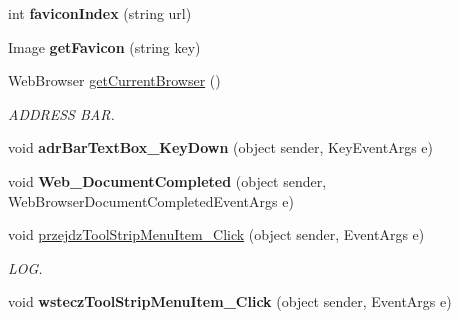 \begin{DoxyCompactItemize}
int {\bfseries favicon\+Index} (string url)
\item 
\mbox{\label{class_windows_forms_app2_1_1_przegladarka_a6d41c318a647f8a1054fdbe57c3c132a}} 
Image {\bfseries get\+Favicon} (string key)
\item 
\mbox{\label{class_windows_forms_app2_1_1_przegladarka_a4d940c14c495053bb984ff254991afbc}} 
Web\+Browser \hyperlink{class_windows_forms_app2_1_1_przegladarka_a4d940c14c495053bb984ff254991afbc}{get\+Current\+Browser} ()
\begin{DoxyCompactList}\small\item\em A\+D\+D\+R\+E\+SS B\+AR. \end{DoxyCompactList}\item 
\mbox{\label{class_windows_forms_app2_1_1_przegladarka_a2c16d9618e633748a8a7eb8c3daa6dc7}} 
void {\bfseries adr\+Bar\+Text\+Box\+\_\+\+Key\+Down} (object sender, Key\+Event\+Args e)
\item 
\mbox{\label{class_windows_forms_app2_1_1_przegladarka_ab0b9d9fb2c8ac43d3db70ed17e913813}} 
void {\bfseries Web\+\_\+\+Document\+Completed} (object sender, Web\+Browser\+Document\+Completed\+Event\+Args e)
\item 
\mbox{\label{class_windows_forms_app2_1_1_przegladarka_a0426aa03eb6aa34e371a649c317a6995}} 
void \hyperlink{class_windows_forms_app2_1_1_przegladarka_a0426aa03eb6aa34e371a649c317a6995}{przejdz\+Tool\+Strip\+Menu\+Item\+\_\+\+Click} (object sender, Event\+Args e)
\begin{DoxyCompactList}\small\item\em L\+OG. \end{DoxyCompactList}\item 
\mbox{\label{class_windows_forms_app2_1_1_przegladarka_add440881c3f047aa654c6e992f84dac8}} 
void {\bfseries wstecz\+Tool\+Strip\+Menu\+Item\+\_\+\+Click} (object sender, Event\+Args e)
\item 
\mbox{\label{class_windows_forms_app2_1_1_przegladarka_a6e7bcbe6a5b31132e29787c80b663d02}} 

\end{DoxyCompactItemize}
